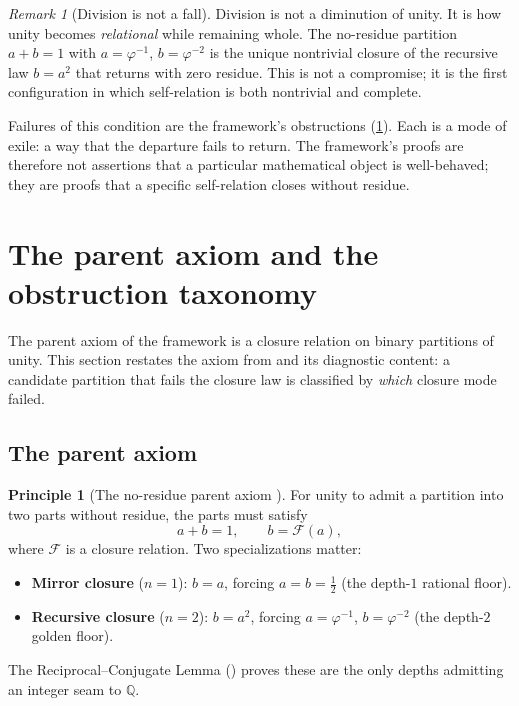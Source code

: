 \documentclass[11pt,a4paper]{article}
\theoremstyle{plain}
\theoremstyle{definition}
\newtheorem{principle}[theorem]{Principle}
\theoremstyle{remark}
\newtheorem{remark}[theorem]{Remark}
\numberwithin{equation}{section}
\providecommand{\Q}{\mathbb{Q}}
\providecommand{\vp}{\varphi}
\providecommand{\half}{\tfrac{1}{2}}
\begin{document}
\begin{remark}[Division is not a fall]
\label{rmk:division-not-fall}
Division is not a diminution of unity.  It is how unity becomes
\emph{relational} while remaining whole.  The no-residue partition
$a + b = 1$ with $a = \vp^{-1}$, $b = \vp^{-2}$ is the unique
nontrivial closure of the recursive law $b = a^2$ that returns with
zero residue.  This is not a compromise; it is the first configuration
in which self-relation is both nontrivial and complete.

Failures of this condition are the framework's obstructions
(\cref{sec:obstruction-taxonomy}).  Each is a mode of exile: a way
that the departure fails to return.  The framework's proofs are
therefore not assertions that a particular mathematical object
is well-behaved; they are proofs that a specific self-relation
closes without residue.
\end{remark}

\section{The parent axiom and the obstruction taxonomy}
\label{sec:obstruction-taxonomy}

The parent axiom of the framework is a closure relation on binary
partitions of unity.  This section restates the axiom from
\cite{no-residue-parent} and its diagnostic content: a candidate
partition that fails the closure law is classified by
\emph{which} closure mode failed.

\subsection{The parent axiom}

\begin{principle}[The no-residue parent axiom {\cite{no-residue-parent}}]
\label{principle:parent}
For unity to admit a partition into two parts without residue, the
parts must satisfy
\[
  a + b = 1, \qquad b = \mathcal{F}(a),
\]
where $\mathcal{F}$ is a closure relation.  Two specializations
matter:
\begin{itemize}[nosep]
\item \textbf{Mirror closure} ($n = 1$): $b = a$, forcing
  $a = b = \half$ (the depth-$1$ rational floor).
\item \textbf{Recursive closure} ($n = 2$): $b = a^2$, forcing
  $a = \vp^{-1}$, $b = \vp^{-2}$ (the depth-$2$ golden floor).
\end{itemize}
The Reciprocal--Conjugate Lemma (\cite[Lem.~2.3]{paper-I-substrate})
proves these are the only depths admitting an integer seam to
$\Q$.
\end{principle}
\end{document}
